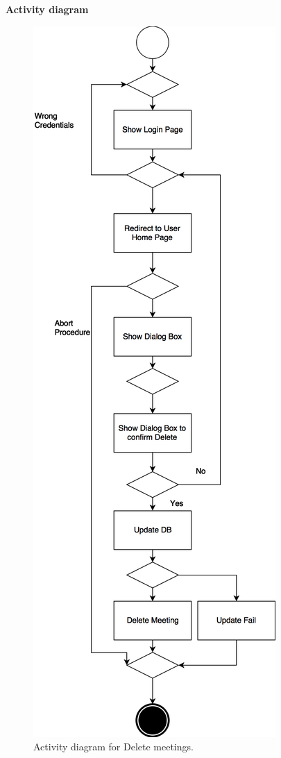\documentclass{article}
\begin{document}
	\newpage
	\noindent
	\textbf{Activity diagram} \\
	
	\begin{figure}[h!]
		\bigskip
		\centering
		\includegraphics[scale=0.25]{img/diagrams/delete_meetings_ad.png}
		\caption{Activity diagram for Delete meetings.}
	\end{figure}
	\newpage
\end{document}
